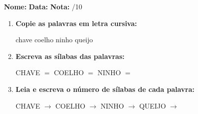 \begin{exercicio}



\noindent\textbf{Nome:} \underline{\hspace{3.2cm}} \quad \textbf{Data:} \underline{\hspace{1.6cm}} \quad \textbf{Nota:} \underline{\hspace{0.9cm}}/10


\begin{enumerate}

  \item \textbf{Copie as palavras em letra cursiva:}
  \begin{center}
  chave \quad coelho \quad ninho \quad queijo
  \end{center}
  \begin{center}
  \underline{\hspace{2.4cm}} \quad \underline{\hspace{2.4cm}} \quad \underline{\hspace{2.4cm}} \quad \underline{\hspace{2.4cm}}
  \end{center}

  \item \textbf{Escreva as sílabas das palavras:}
  \begin{center}
  CHAVE $=$ \underline{\hspace{1.5cm}} \underline{\hspace{1.5cm}} \quad COELHO $=$ \underline{\hspace{1.5cm}} \underline{\hspace{1.5cm}} \quad NINHO $=$ \underline{\hspace{1.5cm}} \underline{\hspace{1.5cm}}
  \end{center}

  \item \textbf{Leia e escreva o número de sílabas de cada palavra:}
  \begin{center}
  CHAVE $\rightarrow$ \underline{\hspace{0.9cm}} \quad COELHO $\rightarrow$ \underline{\hspace{0.9cm}} \quad NINHO $\rightarrow$ \underline{\hspace{0.9cm}} \quad QUEIJO $\rightarrow$ \underline{\hspace{0.9cm}}
  \end{center}


\end{enumerate}
\end{exercicio}
